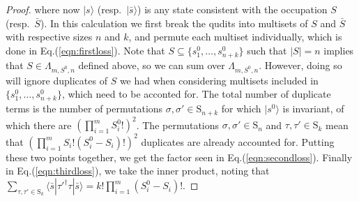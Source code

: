 \begin{proof}
where now $|s\rangle$ (resp.\ $|\bar{s}\rangle$) is any state consistent with the occupation $S$ (resp.\ $\bar{S}$). 
In this calculation we first break the qudits into multisets of $S$ and $\bar{S}$ with respective sizes $n$ and $k$, and permute each multiset individually, which is done in Eq.(\ref{eqn:firstloss}). 
Note that $S \subseteq \{s^0_{1},\dots,s^0_{n+k}\}$ such that $|S|=n$ implies that $S\in\Lambda_{m,S^0,n}$ defined above, so we can sum over $\Lambda_{m,S^0,n}$. 
However, doing so will ignore duplicates of $S$ we had when considering multisets included in $\{s^0_1,\dots,s^0_{n+k}\}$, which need to be acconted for. 
The total number of duplicate terms is the number of permutations $\sigma,\sigma'\in\textrm{S}_{n+k}$ for which $|s^0\rangle$ is invariant, of which there are $(\prod_{i=1}^m S^0_i!)^2$. 
The permutations $\sigma,\sigma'\in\textrm{S}_n$ and $\tau,\tau'\in\textrm{S}_k$ mean that $(\prod_{i=1}^mS_i!(S_i^0-S_i)!)^2$ duplicates are already accounted for. 
Putting these two points together, we get the factor seen in Eq.(\ref{eqn:secondloss}). 
Finally in Eq.(\ref{eqn:thirdloss}), we take the inner product, noting that $\sum_{\tau,\tau'\in\textrm{S}_k}\langle \bar{s}|\tau'^\dagger\tau|\bar{s}\rangle = k!\prod_{i=1}^m(S_i^0-S_i)!$.


\end{proof}
